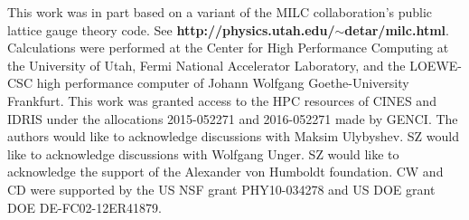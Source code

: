 \documentclass[aps,prd,twocolumn,showpacs,superscriptaddress,groupedaddress]{revtex4}  %
\begin{document}
\acknowledgements
This work was in part based on a variant of the MILC collaboration's public lattice gauge theory code. See {\bf http://physics.utah.edu/$\sim$detar/milc.html}.
Calculations were performed at the Center for High Performance Computing at the University of Utah, Fermi National Accelerator Laboratory, and the LOEWE-CSC high performance
computer of Johann Wolfgang Goethe-University Frankfurt. This work was granted access to the HPC resources of CINES and IDRIS under the allocations 2015-052271 and 2016-052271 made by GENCI.
The authors would like to acknowledge discussions with Maksim Ulybyshev. SZ would like to acknowledge discussions with Wolfgang Unger.
SZ would like to acknowledge the support of the Alexander von Humboldt foundation. CW and CD were supported by the US NSF grant PHY10-034278 and US DOE grant DOE DE-FC02-12ER41879.

\appendix
\end{document}
